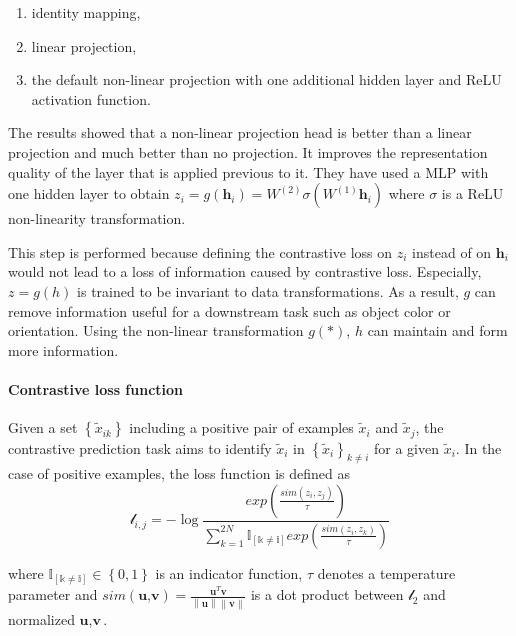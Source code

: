 \documentclass[
]{krantz}
\providecommand{\tightlist}{%
  \setlength{\itemsep}{0pt}\setlength{\parskip}{0pt}}
\begin{document}
\begin{enumerate}
\def\labelenumi{\arabic{enumi}.}
\tightlist
\item
  identity mapping,
\item
  linear projection,
\item
  the default non-linear projection with one additional hidden layer and ReLU activation function.
\end{enumerate}

The results showed that a non-linear projection head is better than a linear projection and much better than no projection. It improves the representation quality of the layer that is applied previous to it. They have used a MLP with one hidden layer to obtain \(z_i = g\left( \textbf{h}_i \right) = W^{\left( 2\right)}\sigma \left( W^{\left( 1\right)} \textbf{h}_i\right)\) where \(\sigma\) is a ReLU non-linearity transformation.

This step is performed because defining the contrastive loss on \(z_i\) instead of on \(\textbf{h}_i\) would not lead to a loss of information caused by contrastive loss. Especially, \(z=g\left( h \right)\) is trained to be invariant to data transformations. As a result, \(g\) can remove information useful for a downstream task such as object color or orientation. Using the non-linear transformation \(g\left( * \right)\), \(h\) can maintain and form more information.

\hypertarget{contrastive-loss-function}{%
\paragraph{Contrastive loss function}\label{contrastive-loss-function}}

Given a set \(\left\{ \tilde{x}_{ik} \right\}\) including a positive pair of examples \(\tilde{x}_{i}\) and \(\tilde{x}_{j}\), the contrastive prediction task aims to identify \(\tilde{x}_{i}\) in \(\left\{ \tilde{x}_{i} \right\}_{k\neq i}\) for a given \(\tilde{x}_{i}\). In the case of positive examples, the loss function is defined as
\[
\mathcal{l}_{i,j} = −\log\frac{exp\left( \frac{sim(z_i,z_j)}{\tau} \right)}{\sum_{k=1}^{2N}\mathbb{I_{\left[ k\neq i \right]}}exp\left( \frac{sim(z_i,z_k)}{\tau} \right)}
\]

where \(\mathbb{I_{\left[ k\neq i \right]}}\in\left\{ 0,1 \right\}\) is an indicator function, \(\tau\) denotes a temperature parameter and \(sim\left(\textbf{u,v} \right)= \frac{\textbf{u}^T\textbf{v}}{\left\| \textbf{u}\right\|\left\| \textbf{v} \right\|}\) is a dot product between \(\mathcal{l}_2\) and normalized \(\textbf{u},\textbf{v}\).
\end{document}
